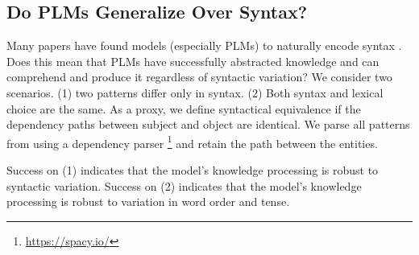 % 

% 





% 




\subsection{Do PLMs Generalize Over Syntax?} 



Many papers have found models (especially PLMs) to naturally
encode syntax
\cite{linzen2016assessing,marvin-linzen-2018-targeted,yoav-syntax,hewitt2019structural}.
Does this mean that PLMs have successfully abstracted
knowledge and can comprehend and produce it regardless of
syntactic variation?
We consider two scenarios. (1) two patterns differ only in
syntax. (2) Both  syntax and  lexical choice are the same.
As a proxy, we define syntactical equivalence if the dependency
paths between subject and object are identical.
We parse all patterns from \resource{} using a dependency parser \cite{spacy}\footnote{\url{https://spacy.io/}} and retain the path between the entities.

Success on (1) indicates
that the model's knowledge processing is robust to syntactic
variation.
Success on (2) indicates
that the model's knowledge processing is robust to
variation in word order and tense.



